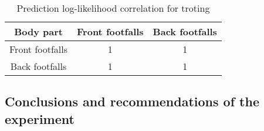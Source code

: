 \begin{table}[h!] 
	\centering
	\begin{tabular}{ |c|c|c|} 	
		\hline	
		\textbf{Body part} & \textbf{Front footfalls} &  \textbf{Back footfalls}\\ 
		\hline
		Front footfalls & 1 & 1\\ 
		\hline
		Back footfalls & 1 & 1\\ 
		\hline	   	
	\end{tabular}
	\caption{Prediction log-likelihood correlation for troting}
	\label{tab:front-back-trot-log-corr}
\end{table}

\subsection{Conclusions and recommendations of the experiment}